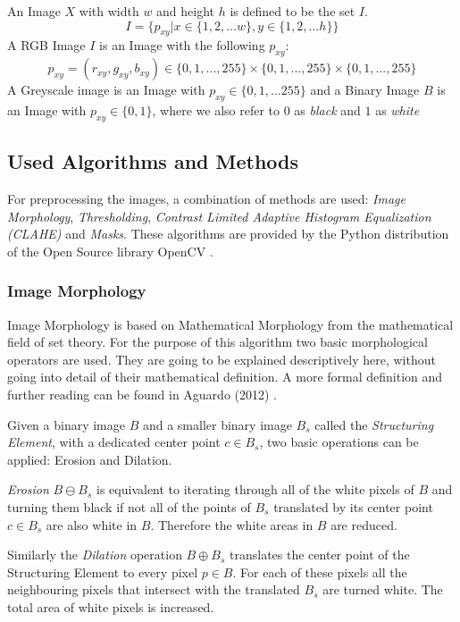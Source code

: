 \documentclass[serif,article,noparskip]{agse-thesis}
\begin{document}
An Image $X$ with width $w$ and height $h$ is defined to be the set $I$. $$I =
\{p_{xy} | x \in \{1,2, \dots w\}, y \in \{1,2, \dots h\} \}$$ A RGB Image $I$
is an Image with the following  $p_{xy}$: $$p_{xy} = (r_{xy}, g_{xy}, b_{xy})
\in \{0,1,...,255\} \times \{0,1,...,255\} \times\{0,1,...,255\}$$ A Greyscale
image is an Image with $p_{xy} \in \{0,1, \dots 255\}$ and a Binary Image $B$ is
an Image with $p_{xy} \in \{0,1\}$, where we also refer to $0$ as \textit{black}
and $1$ as \textit{white}

\subsection{Used Algorithms and Methods} \label{used}

For preprocessing the images, a combination of methods are used: \textit{Image
Morphology}, \textit{Thresholding}, \textit{Contrast Limited Adaptive Histogram
Equalization (CLAHE)} and \textit{Masks}. These algorithms are provided by the
Python distribution of the Open Source library OpenCV \cite{opencv_library}.

\subsubsection{Image Morphology}

Image Morphology is based on Mathematical Morphology from the mathematical field
of set theory. For the purpose of this algorithm two basic morphological
operators are used. They are going to be explained descriptively here, without
going into detail of their mathematical definition. A more formal definition and
further reading can be found in Aguardo (2012) \cite{Aguardo2012}.

Given a binary image $B$ and a smaller binary image $B_s$ called the
\textit{Structuring Element}, with a dedicated center point $c \in B_s$, two
basic operations can be applied: Erosion and Dilation.

\textit{Erosion} $B \ominus B_s$ is equivalent to iterating through all of the white
pixels of $B$ and turning them black if not all of the points of $B_s$
translated by its center point $c \in B_s$ are also white in $B$. Therefore the
white areas in $B$ are reduced. \cite{Smith1997}

Similarly the \textit{Dilation} operation  $B \oplus B_s$ translates the center
point of the Structuring Element to every pixel $p \in B$. For each of these
pixels all the neighbouring pixels that intersect with the translated $B_s$ are
turned white. The total area of white pixels is increased. \cite{Smith1997}
\end{document}
